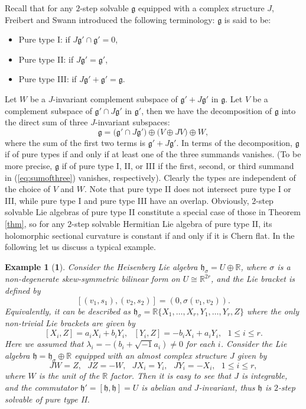 \documentclass{amsart}
\newtheorem*{example}{Example}
\begin{document}
Recall that for any  $2$-step solvable ${\mathfrak g}$ equipped with a complex structure $J$, Freibert and Swann introduced the following terminology: ${\mathfrak g}$  is said to be:
\begin{itemize} 
\item Pure type I: if  $J{\mathfrak g}'\cap {\mathfrak g}'=0$,
\item Pure type II: if $J{\mathfrak g}'={\mathfrak g}'$,
\item Pure type III: if $J{\mathfrak g}'+{\mathfrak g}'={\mathfrak g}$.
\end{itemize}
Let $W$ be a $J$-invariant complement subspace of ${\mathfrak g}' + J{\mathfrak g}'$ in ${\mathfrak g}$. Let $V$ be a complement subspace of ${\mathfrak g}'\cap J {\mathfrak g}'$ in ${\mathfrak g}'$, then we have the decomposition of ${\mathfrak g}$ into the direct sum of three $J$-invariant subspaces:
\begin{equation} \label{eq:sumofthree}
 {\mathfrak g} = \big( {\mathfrak g}'\cap J {\mathfrak g}' \big) \oplus \big( V \oplus JV\big) \oplus W, 
 \end{equation}
where the sum of the first two terms is ${\mathfrak g}' + J{\mathfrak g}'$. In terms of the decomposition, ${\mathfrak g}$ if of pure types if and only if at least one of the three summands vanishes. (To be more precise, ${\mathfrak g}$ if of pure type I, II, or III if the first, second, or third summand in (\ref{eq:sumofthree}) vanishes, respectively). Clearly the types are independent of the choice of $V$ and $W$. Note that pure type II does not intersect pure type I or III, while pure type I and pure type III have an overlap. Obviously, $2$-step solvable Lie algebras of pure type II constitute a special case of those in Theorem \ref{thm}, so for any $2$-step solvable Hermitian Lie algebra of pure type II, its holomorphic sectional curvature is constant if and only if it is Chern flat. In the following let us discuss a typical example.

\begin{example}[{\bf 1}]
Consider the Heisenberg Lie algebra ${\mathfrak h}_{\sigma} = U\oplus {\mathbb R}$, where $\sigma$ is a non-degenerate skew-symmetric bilinear form on $U\cong {\mathbb R}^{2r}$, and the Lie bracket is defined by 
$$[(v_1, s_1), (v_2, s_2)] = (0, \sigma (v_1, v_2)). $$ 
Equivalently, it can be described as ${\mathfrak h}_{\sigma}={\mathbb R}\{ X_1, \ldots ,X_r, Y_1, \ldots , Y_r, Z\}$ where the only non-trivial Lie brackets are given by
$$ [X_i, Z] = a_iX_i + b_i Y_i, \ \ \ [Y_i, Z] = -b_iX_i + a_i Y_i, \ \ \ 1\leq i\leq r. $$
Here we assumed that $\lambda_i = -(b_i + \sqrt{-1}a_i) \neq 0$ for each $i$. Consider the Lie algebra ${\mathfrak h}= {\mathfrak h}_{\sigma}\oplus {\mathbb R}$ equipped with an almost complex structure $J$ given by
$$ JW=Z, \ \ \ JZ=-W, \ \ \ JX_i=Y_i, \ \ \ JY_i = - X_i, \ \ \ 1\leq i\leq r, $$
where $W$ is the unit of the ${\mathbb R}$ factor. Then it is easy to see that $J$ is integrable, and the commutator ${\mathfrak h}'=[{\mathfrak h}, {\mathfrak h}]=U$ is abelian and $J$-invariant, thus ${\mathfrak h}$ is $2$-step solvable of pure type II. 
\end{example}
\end{document}
